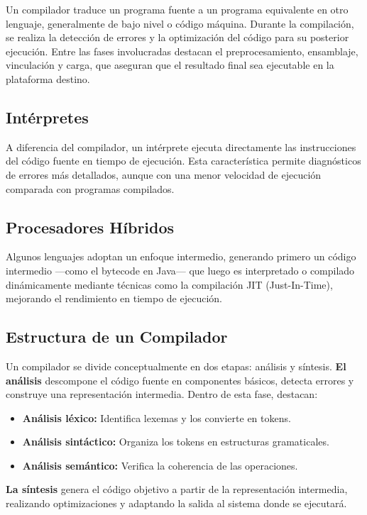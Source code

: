 \documentclass{article}
\begin{document}
Un compilador traduce un programa fuente a un programa equivalente en otro lenguaje, generalmente de bajo nivel o código máquina. Durante la compilación, se realiza la detección de errores y la optimización del código para su posterior ejecución. Entre las fases involucradas destacan el preprocesamiento, ensamblaje, vinculación y carga, que aseguran que el resultado final sea ejecutable en la plataforma destino.

\subsection*{Intérpretes}

A diferencia del compilador, un intérprete ejecuta directamente las instrucciones del código fuente en tiempo de ejecución. Esta característica permite diagnósticos de errores más detallados, aunque con una menor velocidad de ejecución comparada con programas compilados.

\subsection*{Procesadores Híbridos}

Algunos lenguajes adoptan un enfoque intermedio, generando primero un código intermedio —como el bytecode en Java— que luego es interpretado o compilado dinámicamente mediante técnicas como la compilación JIT (Just-In-Time), mejorando el rendimiento en tiempo de ejecución.

\subsection*{Estructura de un Compilador}

Un compilador se divide conceptualmente en dos etapas: análisis y síntesis.  
\textbf{El análisis} descompone el código fuente en componentes básicos, detecta errores y construye una representación intermedia. Dentro de esta fase, destacan:
\begin{itemize}
    \item \textbf{Análisis léxico:} Identifica lexemas y los convierte en tokens.
    \item \textbf{Análisis sintáctico:} Organiza los tokens en estructuras gramaticales.
    \item \textbf{Análisis semántico:} Verifica la coherencia de las operaciones.
\end{itemize}

\textbf{La síntesis} genera el código objetivo a partir de la representación intermedia, realizando optimizaciones y adaptando la salida al sistema donde se ejecutará.
\end{document}
